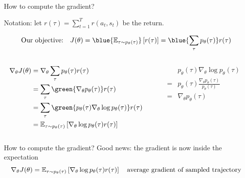 \documentclass[usenames,dvipsnames,notes,11pt,aspectratio=169,hyperref={colorlinks=true, linkcolor=blue}]{beamer}
\begin{document}
\begin{frame}
    {How to compute the gradient?}

    Notation: let $r(\tau)=\sum_{t=1}^T r(a_t, s_t)$ be the return.
    \pause

    $$
    \text{Our objective:} \quad
    J(\theta)=\blue{\BE_{\tau\sim p_\theta(\tau)}}\pb{r(\tau)}
    =\blue{\sum_\tau p_\theta(\tau)} r(\tau)
    $$
    \pause

    \begin{columns}
        \begin{column}{0.5\textwidth}
    \begin{align*}
    \nabla_\theta J(\theta) &= \nabla_\theta \sum_\tau p_\theta(\tau) r(\tau)\\
        &= \sum_\tau \green{\nabla_\theta p_\theta(\tau)} r(\tau)\\
        &= \sum_\tau \green{p_\theta(\tau) \nabla_\theta \log p_\theta(\tau)} r(\tau)\\
        &= \BE_{\tau\sim p_\theta(\tau)}\pb{\nabla_\theta \log p_\theta(\tau) r(\tau)}
    \end{align*}
        \end{column}
        \begin{column}{0.5\textwidth}
            \begin{mdframed}[backgroundcolor=gray!20, linewidth=0pt, frametitle={log derivative trick}]
    \begin{align*}
        &p_\theta(\tau) \nabla_\theta \log p_\theta(\tau)\\
        =&   p_\theta(\tau) \frac{\nabla_\theta p_\theta(\tau)}{p_\theta(\tau)}\\
        =& \nabla_\theta p_\theta(\tau)
    \end{align*}
            \end{mdframed}
        \end{column}
    \end{columns}
\end{frame}

\begin{frame}
    {How to compute the gradient?}
    Good news: the gradient is now inside the expectation 
    $$
    \nabla_\theta J(\theta) = \mathbb{E}_{\tau\sim p_\theta(\tau)}\left[ \nabla_\theta \log p_\theta(\tau) r(\tau) \right]
    \quad \text{average gradient of sampled trajectory}
    $$

\end{frame}
\end{document}
